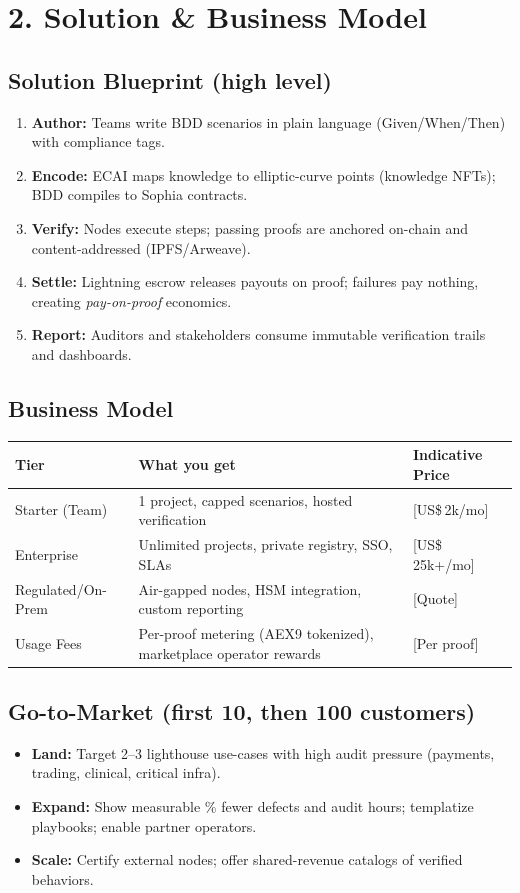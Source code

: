 \documentclass[11pt]{article}
\begin{document}
\section*{2. Solution \& Business Model}
\subsection*{Solution Blueprint (high level)}
\begin{enumerate}[label=\arabic*.]
  \item \textbf{Author:} Teams write BDD scenarios in plain language (Given/When/Then) with compliance tags.
  \item \textbf{Encode:} ECAI maps knowledge to elliptic-curve points (knowledge NFTs); BDD compiles to Sophia contracts.
  \item \textbf{Verify:} Nodes execute steps; passing proofs are anchored on-chain and content-addressed (IPFS/Arweave).
  \item \textbf{Settle:} Lightning escrow releases payouts on proof; failures pay nothing, creating \emph{pay-on-proof} economics.
  \item \textbf{Report:} Auditors and stakeholders consume immutable verification trails and dashboards.
\end{enumerate}

\subsection*{Business Model}
\noindent\begin{tabularx}{\linewidth}{@{}lXl@{}}
\toprule
\textbf{Tier} & \textbf{What you get} & \textbf{Indicative Price} \\
\midrule
Starter (Team) & 1 project, capped scenarios, hosted verification & [US\$\,2k/mo] \\
Enterprise & Unlimited projects, private registry, SSO, SLAs & [US\$\,25k+/mo] \\
Regulated/On-Prem & Air-gapped nodes, HSM integration, custom reporting & [Quote] \\
Usage Fees & Per-proof metering (AEX9 tokenized), marketplace operator rewards & [Per proof] \\
\bottomrule
\end{tabularx}

\subsection*{Go-to-Market (first 10, then 100 customers)}
\begin{itemize}
  \item \textbf{Land:} Target 2--3 lighthouse use-cases with high audit pressure (payments, trading, clinical, critical infra).\\
  \item \textbf{Expand:} Show measurable \% fewer defects and audit hours; templatize playbooks; enable partner operators.\\
  \item \textbf{Scale:} Certify external nodes; offer shared-revenue catalogs of verified behaviors.
\end{itemize}
\end{document}
